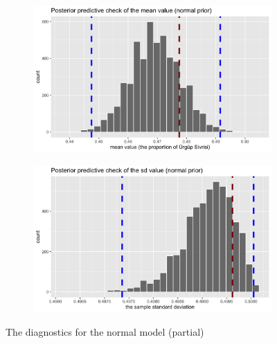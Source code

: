 \documentclass[12pt]{article}
\begin{document}
\begin{figure}[ht]
    \begin{subfigure}[b]{0.45\textwidth}
        \centering
        \includegraphics[width=\linewidth]{figures/ppc_normal_mean.png}
        \label{fig:4c}
    \end{subfigure}
    \hfill
    \begin{subfigure}[b]{0.45\textwidth}
        \centering
        \includegraphics[width=\linewidth]{figures/ppc_normal_sd.png}
        \label{fig:4d}
        
    \end{subfigure}
    
    \caption{The diagnostics for the normal model (partial)}
    \label{fig:mixing_normal}
\end{figure}





\end{document}
